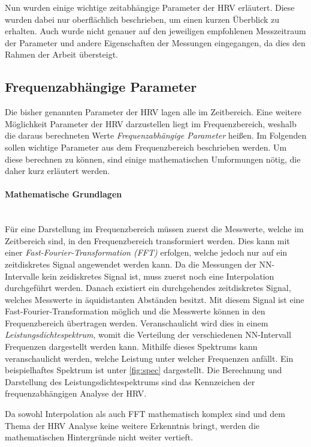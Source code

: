Nun wurden einige wichtige zeitabhängige Parameter der HRV erläutert. Diese wurden dabei nur oberflächlich beschrieben, um einen kurzen Überblick zu erhalten. Auch wurde nicht genauer auf den jeweiligen empfohlenen Messzeitraum der Parameter und andere Eigenschaften der Messungen eingegangen, da dies den Rahmen der Arbeit übersteigt. 
 
\subsection{Frequenzabhängige Parameter}	

 Die bisher genannten Parameter der HRV lagen alle im Zeitbereich. Eine weitere Möglichkeit Parameter der HRV darzustellen liegt im Frequenzbereich, weshalb die daraus berechneten Werte \textit{Frequenzabhängige Parameter} heißen. Im Folgenden sollen wichtige Parameter aus dem Frequenzbereich beschrieben werden. Um diese berechnen zu können, sind einige mathematischen Umformungen nötig, die daher kurz erläutert werden.\\
 
 \paragraph{Mathematische Grundlagen}\mbox{} \\
 Für eine Darstellung im Frequenzbereich müssen zuerst die Messwerte, welche im Zeitbereich sind, in den Frequenzbereich transformiert werden. Dies kann mit einer \textit{Fast-Fourier-Transformation (FFT)} erfolgen, welche jedoch nur auf ein zeitdiskretes Signal angewendet werden kann. Da die Messungen der NN-Intervalle kein zeidiskretes Signal ist, muss zuerst noch eine Interpolation durchgeführt werden. Danach existiert ein durchgehendes zeitdiskretes Signal, welches Messwerte in äquidistanten Abständen besitzt. Mit diesem Signal ist eine Fast-Fourier-Transformation möglich und die Messwerte können in den Frequenzbereich übertragen werden. Veranschaulicht wird dies in einem \textit{Leistungsdichtespektrum}, womit die Verteilung der verschiedenen NN-Intervall Frequenzen dargestellt werden kann. Mithilfe dieses Spektrums kann veranschaulicht werden, welche Leistung unter welcher Frequenzen anfällt. Ein beispielhaftes Spektrum ist unter \ref{fig:spec} dargestellt. Die Berechnung und Darstellung des Leistungsdichtespektrums sind das Kennzeichen der frequenzabhängigen Analyse der HRV.\cite{freque}

 Da sowohl Interpolation als auch FFT mathematisch komplex sind und dem Thema der HRV Analyse keine weitere Erkenntnis bringt, werden die mathematischen Hintergründe nicht weiter vertieft.
 
